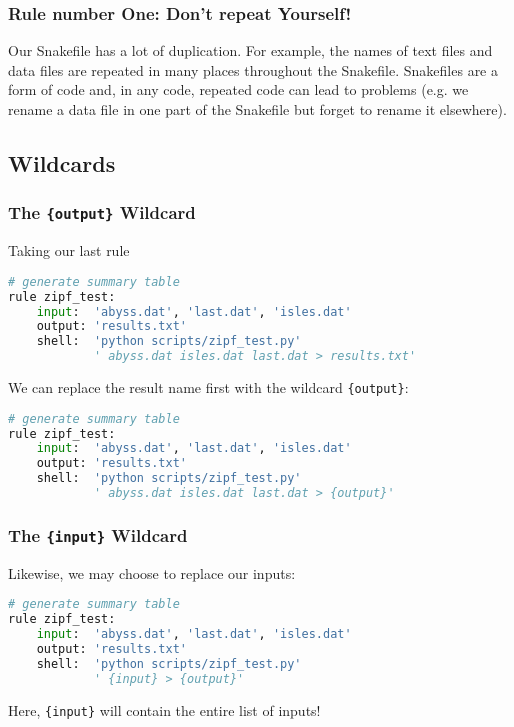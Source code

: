 \begin{frame}
  \frametitle{Rule number One: Don't repeat Yourself!}

Our Snakefile has a lot of duplication. For example, the names of text files and data files are repeated in many places throughout the Snakefile. Snakefiles are a form of code and, in any code, repeated code can lead to problems (e.g. we rename a data file in one part of the Snakefile but forget to rename it elsewhere).
\end{frame}

\subsection{Wildcards}

\begin{frame}[fragile]
  \frametitle{The \texttt{\{output\}} Wildcard}
  Taking our last rule
  \begin{lstlisting}[language=Python,style=Python]
# generate summary table
rule zipf_test:
    input:  'abyss.dat', 'last.dat', 'isles.dat'
    output: 'results.txt'
    shell:  'python scripts/zipf_test.py' 
            ' abyss.dat isles.dat last.dat > results.txt'
  \end{lstlisting}
  We can replace the result name first with the wildcard \texttt{\{output\}}:
  \begin{lstlisting}[language=Python,style=Python]
# generate summary table
rule zipf_test:
    input:  'abyss.dat', 'last.dat', 'isles.dat'
    output: 'results.txt'
    shell:  'python scripts/zipf_test.py' 
            ' abyss.dat isles.dat last.dat > {output}'
  \end{lstlisting}
\end{frame}

\begin{frame}[fragile]
  \frametitle{The \texttt{\{input\}} Wildcard}
  Likewise, we may choose to replace our inputs:
  \begin{lstlisting}[language=Python,style=Python]
# generate summary table
rule zipf_test:
    input:  'abyss.dat', 'last.dat', 'isles.dat'
    output: 'results.txt'
    shell:  'python scripts/zipf_test.py' 
            ' {input} > {output}'
  \end{lstlisting}
  Here, \texttt{\{input\}} will contain the entire list of inputs!
\end{frame}

